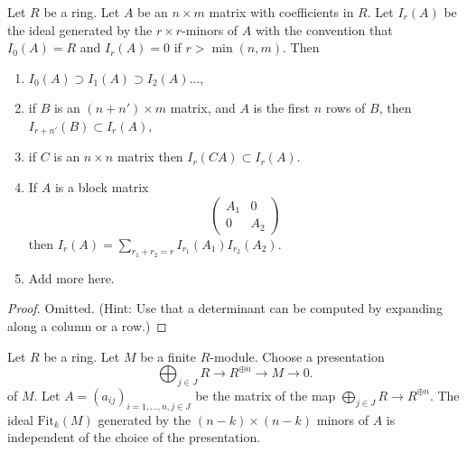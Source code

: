 \begin{lemma}
\label{lemma-ideals-generated-by-minors}
Let $R$ be a ring. Let $A$ be an $n \times m$ matrix with coefficients
in $R$. Let $I_r(A)$ be the ideal generated by the $r \times r$-minors
of $A$ with the convention that $I_0(A) = R$ and $I_r(A) = 0$ if
$r > \min(n, m)$. Then
\begin{enumerate}
\item $I_0(A) \supset I_1(A) \supset I_2(A) \ldots$,
\item if $B$ is an $(n + n') \times m$ matrix, and $A$ is the first
$n$ rows of $B$, then $I_{r + n'}(B) \subset I_r(A)$,
\item if $C$ is an $n \times n$ matrix then $I_r(CA) \subset I_r(A)$.
\item If $A$ is a block matrix
$$
\left(
\begin{matrix}
A_1 & 0 \\
0 & A_2 
\end{matrix}
\right)
$$
then $I_r(A) = \sum_{r_1 + r_2 = r} I_{r_1}(A_1) I_{r_2}(A_2)$.
\item Add more here.
\end{enumerate}
\end{lemma}

\begin{proof}
Omitted. (Hint: Use that a determinant can be computed by expanding
along a column or a row.)
\end{proof}

\begin{lemma}
\label{lemma-fitting-ideal}
Let $R$ be a ring. Let $M$ be a finite $R$-module. Choose a presentation
$$
\bigoplus\nolimits_{j \in J} R \longrightarrow R^{\oplus n}
\longrightarrow M \longrightarrow 0.
$$
of $M$. Let $A = (a_{ij})_{i = 1, \ldots, n, j \in J}$ be the matrix
of the map $\bigoplus_{j \in J} R \to R^{\oplus n}$.
The ideal $\text{Fit}_k(M)$ generated by the
$(n - k) \times (n - k)$ minors of
$A$ is independent of the choice of the presentation.
\end{lemma}

